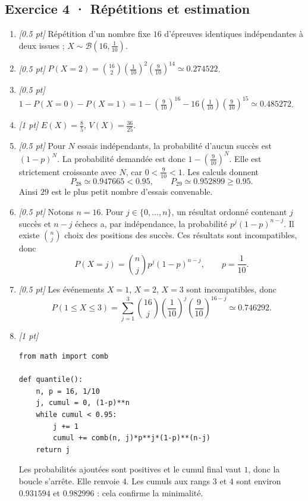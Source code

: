 \subsection*{Exercice 4 · Répétitions et estimation}\begin{enumerate}

\item \textit{[\num{0,5} pt]} Répétition d'un nombre fixe $16$ d'épreuves identiques indépendantes à deux issues ; $X\sim\mathcal B(16,\frac{1}{10})$.

\item \textit{[\num{0,5} pt]} $P(X=2)=\binom{16}2(\frac{1}{10})^2(\frac{9}{10})^{14}\simeq\num{0,274522}$.

\item \textit{[\num{0,5} pt]} $1-P(X=0)-P(X=1)=1-(\frac{9}{10})^{16}-16(\frac{1}{10})(\frac{9}{10})^{15}\simeq\num{0,485272}$.

\item \textit{[1 pt]} $E(X)=\frac{8}{5}$, $V(X)=\frac{36}{25}$.

\item \textit{[\num{0,5} pt]} Pour $N$ essais indépendants, la probabilité d'aucun succès est $(1-p)^N$. La probabilité demandée est donc $1-(\frac{9}{10})^N$. Elle est strictement croissante avec $N$, car $0<\frac{9}{10}<1$. Les calculs donnent
\[P_{28}\simeq\num{0,947665}<\num{0,95},\qquad P_{29}\simeq\num{0,952899}\ge\num{0,95}.\]
Ainsi $29$ est le plus petit nombre d'essais convenable.

\item \textit{[\num{0,5} pt]} Notons $n=16$. Pour $j\in\{0,\ldots,n\}$, un résultat ordonné contenant $j$ succès et $n-j$ échecs a, par indépendance, la probabilité $p^j(1-p)^{n-j}$. Il existe $\binom nj$ choix des positions des succès. Ces résultats sont incompatibles, donc
\[P(X=j)=\binom nj p^j(1-p)^{n-j},\qquad p=\frac{1}{10}.\]

\item \textit{[\num{0,5} pt]} Les événements $X=1$, $X=2$, $X=3$ sont incompatibles, donc
\[P(1\le X\le3)=\sum_{j=1}^3\binom{16}j(\frac{1}{10})^j(\frac{9}{10})^{16-j}\simeq\num{0,746292}.\]


\item \textit{[1 pt]} 
\begin{lstlisting}
from math import comb

def quantile():
    n, p = 16, 1/10
    j, cumul = 0, (1-p)**n
    while cumul < 0.95:
        j += 1
        cumul += comb(n, j)*p**j*(1-p)**(n-j)
    return j
\end{lstlisting}
Les probabilités ajoutées sont positives et le cumul final vaut $1$, donc la boucle s'arrête. Elle renvoie $4$. Les cumuls aux rangs $3$ et $4$ sont environ $\num{0,931594}$ et $\num{0,982996}$ : cela confirme la minimalité.

\end{enumerate}

